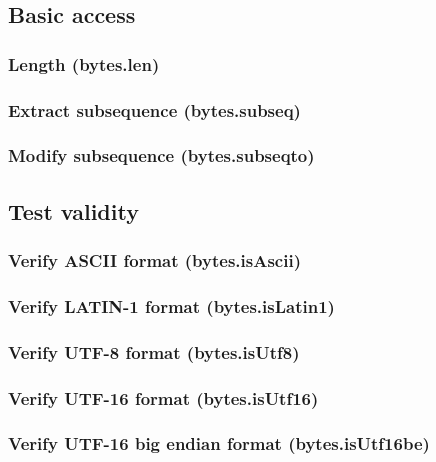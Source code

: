 \documentclass{article}
\theoremstyle{definition}
\begin{document}
\subsection{Basic access}

\subsubsection{Length (bytes.len)}

\subsubsection{Extract subsequence (bytes.subseq)}

\subsubsection{Modify subsequence (bytes.subseqto)}

\subsection{Test validity}

\subsubsection{Verify ASCII format (bytes.isAscii)}

\subsubsection{Verify LATIN-1 format (bytes.isLatin1)}

\subsubsection{Verify UTF-8 format (bytes.isUtf8)}

\subsubsection{Verify UTF-16 format (bytes.isUtf16)}

\subsubsection{Verify UTF-16 big endian format (bytes.isUtf16be)}
\end{document}
